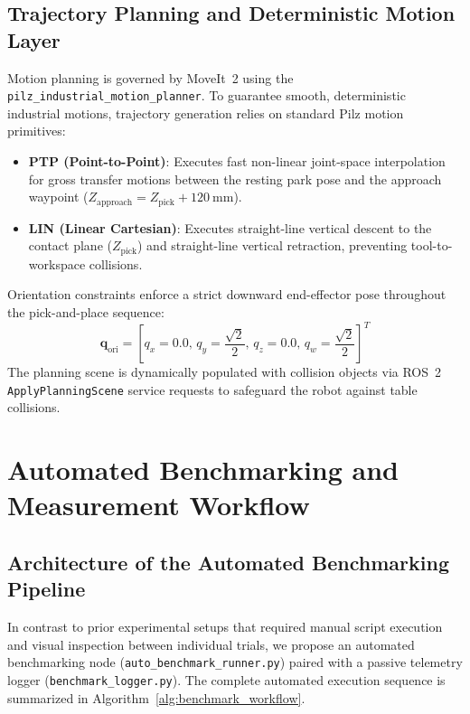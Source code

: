 \documentclass[runningheads]{llncs}
\begin{document}
\subsection{Trajectory Planning and Deterministic Motion Layer}
Motion planning is governed by MoveIt~2 using the \texttt{pilz\_industrial\_motion\_planner}. To guarantee smooth, deterministic industrial motions, trajectory generation relies on standard Pilz motion primitives:
\begin{itemize}
    \item \textbf{PTP (Point-to-Point)}: Executes fast non-linear joint-space interpolation for gross transfer motions between the resting park pose and the approach waypoint ($Z_{\text{approach}} = Z_{\text{pick}} + \SI{120}{\milli\meter}$).
    \item \textbf{LIN (Linear Cartesian)}: Executes straight-line vertical descent to the contact plane ($Z_{\text{pick}}$) and straight-line vertical retraction, preventing tool-to-workspace collisions.
\end{itemize}
Orientation constraints enforce a strict downward end-effector pose throughout the pick-and-place sequence:
\begin{equation}
    \mathbf{q}_{\text{ori}} = \left[ q_x = 0.0, \, q_y = \frac{\sqrt{2}}{2}, \, q_z = 0.0, \, q_w = \frac{\sqrt{2}}{2} \right]^T
\end{equation}
The planning scene is dynamically populated with collision objects via ROS~2 \texttt{ApplyPlanningScene} service requests to safeguard the robot against table collisions.

\section{Automated Benchmarking and Measurement Workflow}
\label{sec:benchmark_workflow}

\subsection{Architecture of the Automated Benchmarking Pipeline}
In contrast to prior experimental setups that required manual script execution and visual inspection between individual trials, we propose an automated benchmarking node (\texttt{auto\_benchmark\_runner.py}) paired with a passive telemetry logger (\texttt{benchmark\_logger.py}). The complete automated execution sequence is summarized in Algorithm~\ref{alg:benchmark_workflow}.
\end{document}
